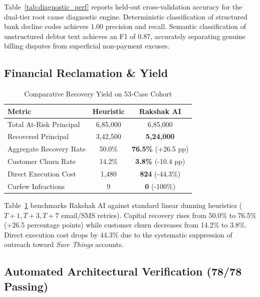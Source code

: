 \documentclass[10pt, twocolumn, a4paper]{article}
\newcommand{\INR}{\text{INR~}}
\begin{document}
Table~\ref{tab:diagnostic_perf} reports held-out cross-validation accuracy for the dual-tier root cause diagnostic engine. Deterministic classification of structured bank decline codes achieves 1.00 precision and recall. Semantic classification of unstructured debtor text achieves an F1 of 0.87, accurately separating genuine billing disputes from superficial non-payment excuses.

\subsection{Financial Reclamation \& Yield}

\begin{table}[t]
\centering
\small
\caption{Comparative Recovery Yield on 53-Case Cohort}
\label{tab:recovery_yield}
\begin{tabularx}{\linewidth}{Xcc}
\toprule
\textbf{Metric} & \textbf{Heuristic} & \textbf{Rakshak AI} \\
\midrule
Total At-Risk Principal & \INR 6,85,000 & \INR 6,85,000 \\
Recovered Principal & \INR 3,42,500 & \textbf{\INR 5,24,000} \\
Aggregate Recovery Rate & 50.0\% & \textbf{76.5\%} (+26.5 pp) \\
Customer Churn Rate & 14.2\% & \textbf{3.8\%} (-10.4 pp) \\
Direct Execution Cost & \INR 1,480 & \textbf{\INR 824} (-44.3\%) \\
Curfew Infractions & 9 & \textbf{0} (-100\%) \\
\bottomrule
\end{tabularx}
\end{table}

Table~\ref{tab:recovery_yield} benchmarks Rakshak AI against standard linear dunning heuristics ($T+1, T+3, T+7$ email/SMS retries). Capital recovery rises from 50.0\% to 76.5\% (+26.5 percentage points) while customer churn decreases from 14.2\% to 3.8\%. Direct execution cost drops by 44.3\% due to the systematic suppression of outreach toward \textit{Sure Things} accounts.

\subsection{Automated Architectural Verification (78/78 Passing)}
\end{document}
